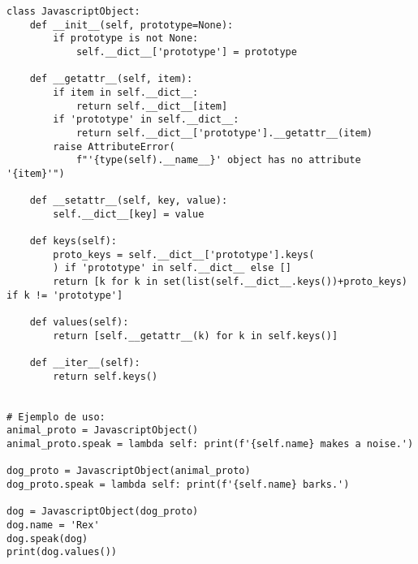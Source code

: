 \documentclass{article}
\begin{document}
\begin{lstlisting}
class JavascriptObject:
    def __init__(self, prototype=None):
        if prototype is not None:
            self.__dict__['prototype'] = prototype

    def __getattr__(self, item):
        if item in self.__dict__:
            return self.__dict__[item]
        if 'prototype' in self.__dict__:
            return self.__dict__['prototype'].__getattr__(item)
        raise AttributeError(
            f"'{type(self).__name__}' object has no attribute '{item}'")

    def __setattr__(self, key, value):
        self.__dict__[key] = value

    def keys(self):
        proto_keys = self.__dict__['prototype'].keys(
        ) if 'prototype' in self.__dict__ else []
        return [k for k in set(list(self.__dict__.keys())+proto_keys) if k != 'prototype']

    def values(self):
        return [self.__getattr__(k) for k in self.keys()]

    def __iter__(self):
        return self.keys()


# Ejemplo de uso:
animal_proto = JavascriptObject()
animal_proto.speak = lambda self: print(f'{self.name} makes a noise.')

dog_proto = JavascriptObject(animal_proto)
dog_proto.speak = lambda self: print(f'{self.name} barks.')

dog = JavascriptObject(dog_proto)
dog.name = 'Rex'
dog.speak(dog)
print(dog.values())
\end{lstlisting}
\end{document}
